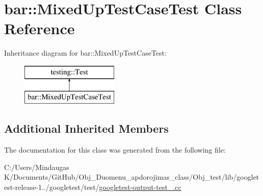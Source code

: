 \hypertarget{classbar_1_1_mixed_up_test_case_test}{}\section{bar\+::Mixed\+Up\+Test\+Case\+Test Class Reference}
\label{classbar_1_1_mixed_up_test_case_test}
Inheritance diagram for bar\+::Mixed\+Up\+Test\+Case\+Test\+:\begin{figure}[H]
\begin{center}
\leavevmode
\includegraphics[height=2.000000cm]{d0/d1c/classbar_1_1_mixed_up_test_case_test}
\end{center}
\end{figure}
\subsection*{Additional Inherited Members}


The documentation for this class was generated from the following file\+:\begin{DoxyCompactItemize}
\item 
C\+:/\+Users/\+Mindaugas K/\+Documents/\+Git\+Hub/\+Obj\+\_\+\+Duomenu\+\_\+apdorojimas\+\_\+class/\+Obj\+\_\+test/lib/googletest-\/release-\/1../googletest/test/\mbox{\hyperlink{_obj__test_2lib_2googletest-release-1_88_81_2googletest_2test_2googletest-output-test___8cc}{googletest-\/output-\/test\+\_\+.\+cc}}\end{DoxyCompactItemize}
